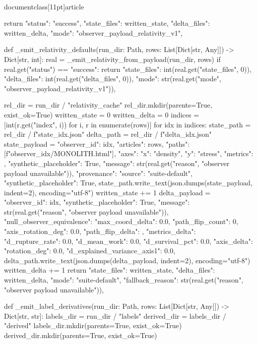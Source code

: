 \\documentclass[11pt]{article}
\begin{document}
\begin{CodeBlock}
    return {
        "status": "success",
        "state_files": written_state,
        "delta_files": written_delta,
        "mode": "observer_payload_relativity_v1",
    }


def _emit_relativity_defaults(run_dir: Path, rows: List[Dict[str, Any]]) -> Dict[str, int]:
    real = _emit_relativity_from_payload(run_dir, rows)
    if real.get("status") == "success":
        return {
            "state_files": int(real.get("state_files", 0)),
            "delta_files": int(real.get("delta_files", 0)),
            "mode": str(real.get("mode", "observer_payload_relativity_v1")),
        }

    rel_dir = run_dir / "relativity_cache"
    rel_dir.mkdir(parents=True, exist_ok=True)
    written_state = 0
    written_delta = 0
    indices = [int(r.get("index", i)) for i, r in enumerate(rows)]
    for idx in indices:
        state_path = rel_dir / f"state_{idx}.json"
        delta_path = rel_dir / f"delta_{idx}.json"
        state_payload = {
            "observer_id": idx,
            "articles": rows,
            "paths": [f"observer_{idx}/MONOLITH.html"],
            "axes": {"x": "density", "y": "stress"},
            "metrics": {},
            "synthetic_placeholder": True,
            "message": str(real.get("reason", "observer payload unavailable")),
            "provenance": {"source": "suite-default", "synthetic_placeholder": True},
        }
        state_path.write_text(json.dumps(state_payload, indent=2), encoding="utf-8")
        written_state += 1
        delta_payload = {
            "observer_id": idx,
            "synthetic_placeholder": True,
            "message": str(real.get("reason", "observer payload unavailable")),
            "null_observer_equivalence": {"max_coord_delta": 0.0, "path_flip_count": 0, "axis_rotation_deg": 0.0},
            "path_flip_delta": {},
            "metrics_delta": {"d_rupture_rate": 0.0, "d_mean_work": 0.0, "d_survival_pct": 0.0},
            "axis_delta": {"rotation_deg": 0.0, "d_explained_variance_axis1": 0.0},
        }
        delta_path.write_text(json.dumps(delta_payload, indent=2), encoding="utf-8")
        written_delta += 1
    return {
        "state_files": written_state,
        "delta_files": written_delta,
        "mode": "suite-default",
        "fallback_reason": str(real.get("reason", "observer payload unavailable")),
    }


def _emit_label_derivatives(run_dir: Path, rows: List[Dict[str, Any]]) -> Dict[str, str]:
    labels_dir = run_dir / "labels"
    derived_dir = labels_dir / "derived"
    labels_dir.mkdir(parents=True, exist_ok=True)
    derived_dir.mkdir(parents=True, exist_ok=True)


\end{CodeBlock}
\end{document}
